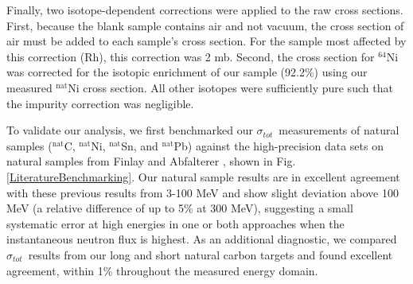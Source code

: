 \documentclass[twocolumn,secnumarabic,amssymb, nobibnotes, aps, prl,
superscriptaddress, nobalancelastpage, draft]{revtex4}
\newcommand{\tot}{\ensuremath{\sigma_{tot}}}
\begin{document}
Finally, two isotope-dependent corrections were applied to the raw cross
sections. First, because the blank sample contains air and not vacuum,
the cross section of air must be added to each sample's cross section.
For the sample most affected by this correction (Rh), this correction was 2 mb.
Second, the cross section for $^{64}$Ni was corrected for the isotopic enrichment of our
sample (92.2\%) using our measured $^{\text{nat}}$Ni cross section. All other isotopes were 
sufficiently pure such that the impurity correction was negligible.

To validate our analysis, we first benchmarked our \tot\ measurements of natural samples
($^{\text{nat}}$C, $^{\text{nat}}$Ni, $^{\text{nat}}$Sn, and
$^{\text{nat}}$Pb) against the high-precision data sets on natural samples from Finlay
\cite{Finlay1993} and Abfalterer \cite{Abfalterer2001}, shown in Fig.
\ref{LiteratureBenchmarking}. Our natural sample results
are in excellent agreement with 
these previous results from 3-100 MeV and show slight deviation above 100 MeV (a
relative difference of up to 5\% at 300 MeV), suggesting a small systematic
error at high energies in one or both approaches when the instantaneous neutron
flux is highest. As an additional diagnostic, we compared 
\tot\ results from our long and short natural carbon targets and
found excellent agreement, within 1\% throughout the measured energy domain.
\end{document}
